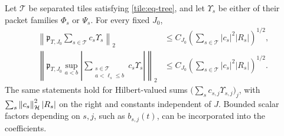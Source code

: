 \begin{lemma}\label{tile:lem-synthesis}
Let \(\mathcal T\) be separated tiles satisfying
\eqref{tile:eq-tree}, and let \(\Upsilon_s\) be either of their
packet families \(\Phi_s\) or \(\Psi_s\).  For every fixed
\(J_0\),
\begin{align}
 \left\|\mathfrak p_{T,J_0}
                \sum_{s\in\mathcal T}c_s\Upsilon_s\right\|_2
 &\leq C_{J_0}
          \left(\sum_{s\in\mathcal T}|c_s|^2|R_s|\right)^{1/2},
                  \label{tile:eq-synthesis}\\
 \left\|\mathfrak p_{T,J_0}
       \sup_{a<b}\left|
        \sum_{\substack{s\in\mathcal T\\a<\ell_s\leq b}}
                  c_s\Upsilon_s\right|\right\|_2
 &\leq C_{J_0}
          \left(\sum_{s\in\mathcal T}|c_s|^2|R_s|\right)^{1/2}.
                  \label{tile:eq-maximal-synthesis}
\end{align}
The same statements hold for Hilbert-valued sums
\(\bigl(\sum_s c_{s,j}\Upsilon_{s,j}\bigr)_j\), with
\(\sum_s\left\|c_s\right\|_{\mathcal H}^2|R_s|\) on the right and
constants independent of \(J\).  Bounded scalar factors depending
on \(s,j\), such as \(b_{s,j}(t)\), can be incorporated into
the coefficients.
\end{lemma}

